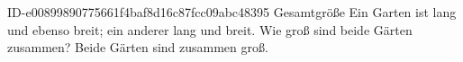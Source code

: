 \begin{exercise}
      {ID-e00899890775661f4baf8d16c87fcc09abc48395}
      {Gesamtgröße}
  \ifproblem\problem
    Ein Garten ist  lang und ebenso breit; ein anderer  lang
    und  breit. Wie groß sind beide Gärten zusammen?
  \fi
  \ifoutcome\outcome
    Beide Gärten sind zusammen  groß.
  \fi
\end{exercise}
